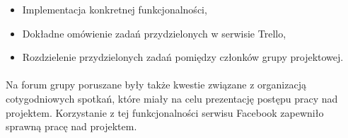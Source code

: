 \begin{itemize}
\item Implementacja konkretnej funkcjonalności,
\item Dokładne omówienie zadań przydzielonych w serwisie Trello,
\item Rozdzielenie przydzielonych zadań pomiędzy członków grupy projektowej.
\end{itemize}
\paragraph{}


Na forum grupy poruszane były także kwestie związane z organizacją cotygodniowych spotkań, które miały na celu prezentację postępu pracy nad projektem. Korzystanie z tej funkcjonalności serwisu Facebook zapewniło sprawną pracę nad projektem. 